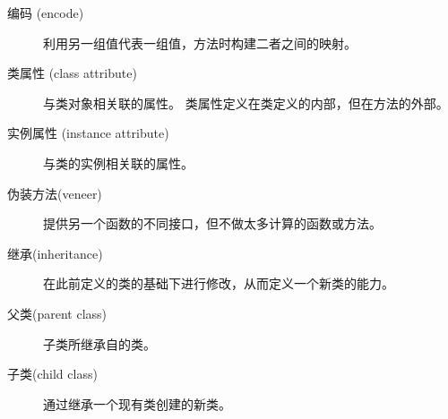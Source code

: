 \begin{description}


\item[编码 (encode)]  利用另一组值代表一组值，方法时构建二者之间的映射。


\item[类属性 (class attribute)]  与类对象相关联的属性。  类属性定义在类定义的内部，但在方法的外部。


\item[实例属性 (instance attribute)]  与类的实例相关联的属性。


\item[伪装方法(veneer)]  提供另一个函数的不同接口，但不做太多计算的函数或方法。


\item[继承(inheritance)]  在此前定义的类的基础下进行修改，从而定义一个新类的能力。


\item[父类(parent class)]  子类所继承自的类。


\item[子类(child class)]  通过继承一个现有类创建的新类。


\end{description}
